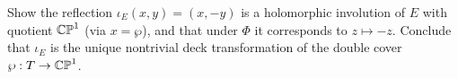 \begin{exercise}
\label{ex:emb-involution}
Show the reflection \(\iota_E(x,y) = (x,-y)\) is a holomorphic involution of \(E\)
with quotient \(\mathbb{CP}^1\) (via \(x = \wp\)), and that under \(\Phi\) it corresponds
to \(z \mapsto -z\). Conclude that \(\iota_E\) is the unique nontrivial deck
transformation of the double cover \(\wp : T \to \mathbb{CP}^1\).
\end{exercise}
